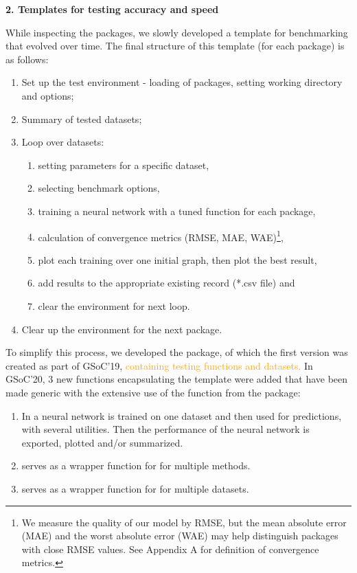 \textbf{2. Templates for testing accuracy and speed}

While inspecting the packages, we slowly developed a template for
benchmarking that evolved over time. The final structure of this
template (for each package) is as follows:

\begin{enumerate}
\def\labelenumi{\arabic{enumi}.}
\tightlist
\item
  Set up the test environment - loading of packages, setting working
  directory and options;
\item
  Summary of tested datasets;
\item
  Loop over datasets:

  \begin{enumerate}
  \def\labelenumii{\alph{enumii}.}
  \tightlist
  \item
    setting parameters for a specific dataset,
  \item
    selecting benchmark options,
  \item
    training a neural network with a tuned function for each package,
  \item
    calculation of convergence metrics (RMSE, MAE, WAE)\footnote{We
      measure the quality of our model by RMSE, but the mean absolute
      error (MAE) and the worst absolute error (WAE) may help
      distinguish packages with close RMSE values. See Appendix A for
      definition of convergence metrics.},
  \item
    plot each training over one initial graph, then plot the best
    result,
  \item
    add results to the appropriate existing record (*.csv file) and
  \item
    clear the environment for next loop.
  \end{enumerate}
\item
  Clear up the environment for the next package.
\end{enumerate}

To simplify this process, we developed the  package, of
which the first version was created as part of GSoC'19,
\textcolor{orange}{containing testing functions and datasets.} In
GSoC'20, 3 new functions encapsulating the template were added that have
been made generic with the extensive use of the  function
from the  package:

\begin{enumerate}
\def\labelenumi{\arabic{enumi}.}
\tightlist
\item
  In  a neural network is trained on one
  dataset and then used for predictions, with several utilities. Then
  the performance of the neural network is exported, plotted and/or
  summarized.
\item
   serves as a wrapper function for
   for multiple methods.
\item
   serves as a wrapper function for
   for multiple datasets.
\end{enumerate}

